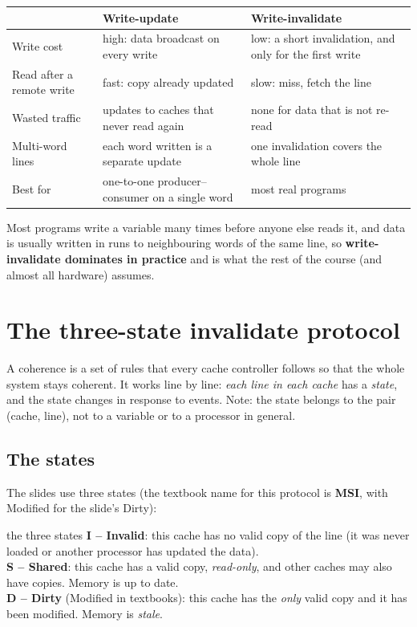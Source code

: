 \begin{center}
\small
\begin{tabularx}{\linewidth}{@{}l X X@{}}
\toprule
 & \textbf{Write-update} & \textbf{Write-invalidate}\\
\midrule
Write cost & high: data broadcast on every write & low: a short invalidation, and only for the first write\\
Read after a remote write & fast: copy already updated & slow: miss, fetch the line\\
Wasted traffic & updates to caches that never read again & none for data that is not re-read\\
Multi-word lines & each word written is a separate update & one invalidation covers the whole line\\
Best for & one-to-one producer--consumer on a single word & most real programs\\
\bottomrule
\end{tabularx}
\end{center}

Most programs write a variable many times before anyone else reads it, and data is usually written in
runs to neighbouring words of the same line, so \textbf{write-invalidate dominates in practice} and is what the
rest of the course (and almost all hardware) assumes.

\section{The three-state invalidate protocol}

A coherence  is a set of rules that every cache controller follows so that the whole system stays coherent. It works
line by line: \emph{each line in each cache} has a \emph{state}, and the state changes in response to events.
Note: the state belongs to the pair (cache, line), not to a variable or to a processor in general.

\subsection{The states}

The slides use three states (the textbook name for this protocol is \textbf{MSI}, with Modified
for the slide's Dirty):

\begin{definition}{the three states}
\textbf{I -- Invalid}: this cache has no valid copy of the line (it was never loaded or another processor has updated the data).\\
\textbf{S -- Shared}: this cache has a valid copy, \emph{read-only}, and other caches may also have copies. Memory is up to date.\\
\textbf{D -- Dirty} (Modified in textbooks): this cache has the \emph{only} valid copy and it has been modified. Memory is
\emph{stale}.
\end{definition}

